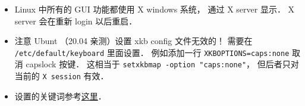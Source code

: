 
\begin{itemize}
\item Linux 中所有的 GUI 功能都使用 X windows 系统， 通过 X server 显示． X server 会在重新 login 以后重启．
\item 注意 Ubunt （20.04 亲测）设置 xkb config 文件无效的！ 需要在 \verb|/etc/default/keyboard| 里面设置． 例如添加一行 \verb|XKBOPTIONS=caps:none| 取消 capslock 按键． 这相当于 \verb|setxkbmap -option "caps:none"|， 但后者只对当前的 \verb|X session| 有效．
\item 设置的关键词参考\href{https://gist.github.com/jatcwang/ae3b7019f219b8cdc6798329108c9aee}{这里}．
\end{itemize}
